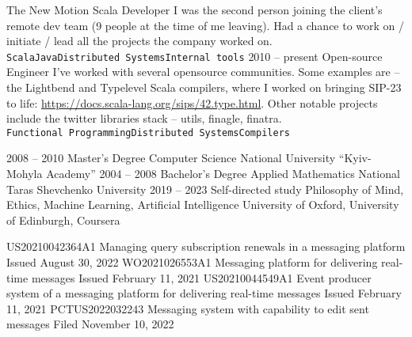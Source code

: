 \documentclass[9pt]{developercv} %
\begin{document}
\begin{entrylist}
		{The New Motion}
		{Scala Developer}
		{
			I was the second person joining the client's remote dev team (9 people at the time of me leaving). Had a chance to work on / initiate / lead all the projects the company worked on.
			\\ \texttt{Scala}\slashsep\texttt{Java}\slashsep\texttt{Distributed Systems}\slashsep\texttt{Internal tools}
		}
	\entry
		{2010 -- present}
		{Open-source}
		{Engineer}
		{
			I've worked with several opensource communities. Some examples are -- the Lightbend and Typelevel Scala compilers, where I worked on bringing SIP-23 to life: \href{https://docs.scala-lang.org/sips/42.type.html}{https://docs.scala-lang.org/sips/42.type.html}. Other notable projects include the twitter libraries stack -- utils, finagle, finatra.\\
			\texttt{Functional Programming}\slashsep\texttt{Distributed Systems}\slashsep\texttt{Compilers}
		}
\end{entrylist}



\begin{entrylist}
	\entry
		{2008 -- 2010}
		{Master's Degree}
		{Computer Science}
		{National University “Kyiv-Mohyla Academy”}
	\entry
		{2004 -- 2008}
		{Bachelor's Degree}
		{Applied Mathematics}
		{National Taras Shevchenko University}
	\entry
		{2019 -- 2023}
		{Self-directed study}
		{Philosophy of Mind, Ethics, Machine Learning, Artificial Intelligence}
		{University of Oxford, University of Edinburgh, Coursera}
\end{entrylist}


\begin{entrylist}
	\entry
		{US20210042364A1}
		{Managing query subscription renewals in a messaging platform}
		{}
		{Issued August 30, 2022}
	\entry
		{WO2021026553A1}
		{Messaging platform for delivering real-time messages}
		{}
		{Issued February 11, 2021}
	\entry
		{US20210044549A1}
		{Event producer system of a messaging platform for delivering real-time messages}
		{}
		{Issued February 11, 2021}
	\entry
		{PCTUS2022032243}
		{Messaging system with capability to edit sent messages}
		{}
		{Filed November 10, 2022}
\end{entrylist}

\end{document}
